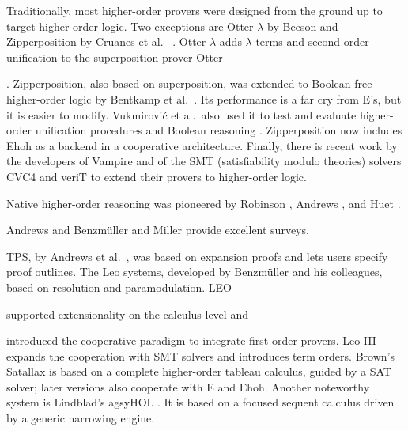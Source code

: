   \begin{sloppypar}
  Traditionally, most higher-order provers were designed from the ground up
  to target higher-order logic. Two
  exceptions are Otter-$\lambda$ by Beeson \cite{mb-04-lam-logic} and
  Zipperposition by Cruanes et al.\ %
  \cite{sc-15-simon-phd,bbtvw-21-sup-lam}. \hbox{Otter-$\lambda$}
  adds $\lambda$-terms and second-order unification to
  the superposition prover Otter\begin{rep} \cite{mcc-03-otter}\end{rep}.
  Zipperposition, also based on superposition, was extended
  to Bool\-e\-an-free higher-order logic by Bentkamp et al.\
  \cite{bbtvw-21-sup-lam}. Its performance is a far cry from E's, but
  it is easier to modify.
  Vukmirovi\'c et al.\ also used it to test and evaluate higher-order unification
  procedures \cite{vbn-21-unif} and Boolean reasoning
  \cite{vn-20-bools}.
  Zipperposition now includes Ehoh as a backend in a cooperative
  architecture.
  Finally, there is recent work by the developers of Vampire
  \cite{br-19-restricted-unif} and of the SMT
  (satisfiability modulo theories) solvers CVC4 and veriT
  \cite{brotb-19-ho-smt} to extend their provers to higher-order logic.
  \end{sloppypar}
  
  Native higher-order reasoning was pioneered by Rob\-in\-son
  \cite{ar-69-hol}, Andrews \cite{pa-71-type-theory}, and Huet
  \cite{gh-73-hol}.\begin{rep} Andrews \cite{pa-01-classical-ty-thy} and Benz\-m\"uller and Miller
  \cite{bm-14-automation-ho} provide excellent surveys.\end{rep}
  TPS, by Andrews et al.~\cite{abinpx-96-tps}, was
  based on expansion proofs and lets users specify proof outlines.
  The Leo \confrep{}{family of }systems, developed by Benzm\"uller and his colleagues,
  \confrep{are}{is} based on resolution and paramodulation.
  LEO~\cite{cbmk-98-leo} \begin{rep}supported extensionality
  on the calculus level and \end{rep}introduced the cooperative paradigm to
  integrate first-order provers.
  Leo-III \cite{sb-21-leo3} expands the cooperation with
  SMT solvers
  and introduces term orders.
  Brown's Sat\-al\-lax \cite{cb-12-satallax} is based on a
  complete higher-order tableau calculus,
  guided by a SAT solver; later versions also cooperate with E and Ehoh.
  Another noteworthy sys\-tem is Lindblad's agsy\-HOL \cite{fl-14-agsyhol}.
  It is based on a focused sequent calculus driven by a generic narrowing engine.
  
